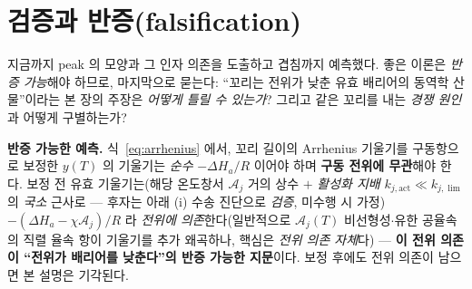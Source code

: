 \documentclass[11pt,a4paper]{article}
\begin{document}
\section{검증과 반증(falsification)}\label{sec:falsify}
지금까지 peak 의 모양과 그 인자 의존을 도출하고 겹침까지 예측했다. 좋은 이론은 \emph{반증 가능}해야 하므로,
마지막으로 묻는다: ``꼬리는 전위가 낮춘 유효 배리어의 동역학 산물''이라는 본 장의 주장은 \emph{어떻게 틀릴 수
있는가}? 그리고 같은 꼬리를 내는 \emph{경쟁 원인}과 어떻게 구별하는가?

\textbf{반증 가능한 예측.} 식~\eqref{eq:arrhenius} 에서, 꼬리 길이의 Arrhenius 기울기를 구동항으로 보정한 $y(T)$
의 기울기는 \emph{순수} $-\Delta H_a/R$ 이어야 하며 \textbf{구동 전위에 무관}해야 한다. 보정 전 유효 기울기는(해당
온도창서 $\mathcal A_j$ 거의 상수 $+$ \emph{활성화 지배} $k_{j,\mathrm{act}}\ll k_{j,\lim}$ 의 \emph{국소} 근사로 — 후자는
아래 (i) 수송 진단으로 \emph{검증}, 미수행 시 가정) $-(\Delta H_a-\chi\mathcal A_j)/R$ 라 \emph{전위에 의존}한다(일반적으로 $\mathcal A_j(T)$
비선형성$\cdot$유한 공율속의 직렬 율속 항이 기울기를 추가 왜곡하나, 핵심은 \emph{전위 의존 자체}다) — \textbf{이 전위
의존이 ``전위가 배리어를 낮춘다''의 반증 가능한 지문}이다. 보정 후에도 전위 의존이 남으면 본 설명은 기각된다.
\end{document}
